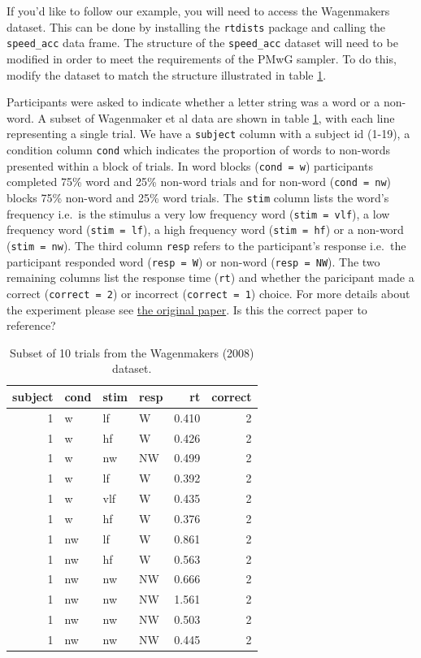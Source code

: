 \documentclass[]{book}
\begin{document}
If you'd like to follow our example, you will need to access the Wagenmakers dataset. This can be done by installing the \texttt{rtdists} package and calling the \texttt{speed\_acc} data frame. The structure of the \texttt{speed\_acc} dataset will need to be modified in order to meet the requirements of the PMwG sampler. To do this, modify the dataset to match the structure illustrated in table \ref{tab:wagenmakers10}.

Participants were asked to indicate whether a letter string was a word or a non-word. A subset of Wagenmaker et al data are shown in table \ref{tab:wagenmakers10}, with each line representing a single trial. We have a \texttt{subject} column with a subject id (1-19), a condition column \texttt{cond} which indicates the proportion of words to non-words presented within a block of trials. In word blocks (\texttt{cond\ =\ w}) participants completed 75\% word and 25\% non-word trials and for non-word (\texttt{cond\ =\ nw}) blocks 75\% non-word and 25\% word trials. The \texttt{stim} column lists the word's frequency i.e.~is the stimulus a very low frequency word (\texttt{stim\ =\ vlf}), a low frequency word (\texttt{stim\ =\ lf}), a high frequency word (\texttt{stim\ =\ hf}) or a non-word (\texttt{stim\ =\ nw}). The third column \texttt{resp} refers to the participant's response i.e.~the participant responded word (\texttt{resp\ =\ W}) or non-word (\texttt{resp\ =\ NW}). The two remaining columns list the response time (\texttt{rt}) and whether the paricipant made a correct (\texttt{correct\ =\ 2}) or incorrect (\texttt{correct\ =\ 1}) choice. For more details about the experiment please see \href{https://www.sciencedirect.com/science/article/pii/S0749596X07000496}{the original paper}. Is this the correct paper to reference?

\begin{table}

\caption{\label{tab:wagenmakers10}Subset of 10 trials from the Wagenmakers (2008) dataset.}
\centering
\begin{tabular}[t]{r|l|l|l|r|r}
\hline
subject & cond & stim & resp & rt & correct\\
\hline
1 & w & lf & W & 0.410 & 2\\
\hline
1 & w & hf & W & 0.426 & 2\\
\hline
1 & w & nw & NW & 0.499 & 2\\
\hline
1 & w & lf & W & 0.392 & 2\\
\hline
1 & w & vlf & W & 0.435 & 2\\
\hline
1 & w & hf & W & 0.376 & 2\\
\hline
1 & nw & lf & W & 0.861 & 2\\
\hline
1 & nw & hf & W & 0.563 & 2\\
\hline
1 & nw & nw & NW & 0.666 & 2\\
\hline
1 & nw & nw & NW & 1.561 & 2\\
\hline
1 & nw & nw & NW & 0.503 & 2\\
\hline
1 & nw & nw & NW & 0.445 & 2\\
\hline
\end{tabular}
\end{table}
\end{document}
